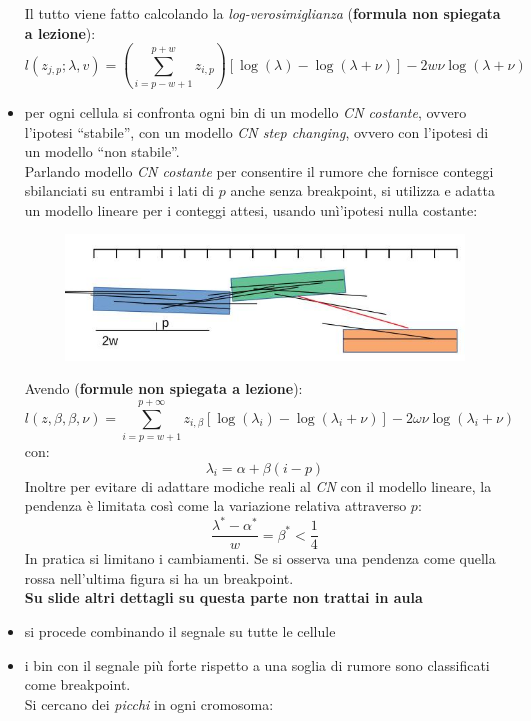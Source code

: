 \documentclass[a4paper,12pt, oneside]{book}
\begin{document}
\begin{itemize}
\begin{figure}[H]
  \end{figure}
  Il tutto viene fatto calcolando la \textit{log-verosimiglianza}
  (\textbf{formula non spiegata a lezione}):
  \[l\left(z_{j, p} ; \lambda, v\right)=\left(\sum_{i=p-w+1}^{p+w} z_{i,
        p}\right)[\log (\lambda)-\log (\lambda+\nu)]-2 w \nu \log
    (\lambda+\nu)\] 
  \item per ogni cellula si confronta ogni bin di un modello \textit{CN
    costante}, ovvero l'ipotesi ``stabile'', con un modello \textit{CN step
    changing}, ovvero con l'ipotesi di un modello ``non stabile''. \\
  Parlando modello \textit{CN costante} per consentire il rumore che fornisce
  conteggi sbilanciati su entrambi i lati di $p$ anche senza breakpoint, si
  utilizza e adatta un modello lineare per i conteggi attesi, usando unì'ipotesi
  nulla costante:
  \begin{figure}[H]
    \centering
    \includegraphics[scale = 0.45]{img/cna3.jpg}
  \end{figure}
  Avendo (\textbf{formule non spiegata a lezione}):
  \[l(z, \beta, \beta, \nu)=\sum_{i=p=w+1}^{p+\infty} z_{i, \beta}\left[\log
      \left(\lambda_{i}\right)-\log \left(\lambda_{i}+\nu\right)\right]-2 \omega
    \nu \log \left(\lambda_{i}+\nu\right)\]
  con:
  \[\lambda_i=\alpha+\beta(i-p)\]
  Inoltre per evitare di adattare modiche reali al \textit{CN} con il
  modello lineare, la pendenza è limitata così come la variazione relativa
  attraverso $p$:
  \[\frac{\lambda^{*}-\alpha^{*}}{w}=\beta^{*}<\frac{1}{4}\]
  In pratica si limitano i cambiamenti. Se si osserva una pendenza come quella
  rossa nell'ultima figura si ha un breakpoint.\\
  \textbf{Su slide altri dettagli su questa parte non trattai in aula}
  \item si procede combinando il segnale su tutte le cellule 
  \item i bin con il segnale più forte rispetto a una soglia di rumore sono
  classificati come breakpoint. \\
  Si cercano dei \textit{picchi} in ogni cromosoma:
  \begin{figure}[H]

\end{figure}
\end{itemize}
\end{document}
